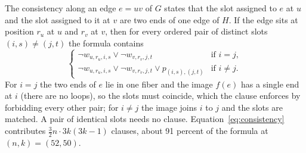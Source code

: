 The consistency along an edge $e = uv$ of $G$ states that the slot assigned to $e$ at $u$ and the slot assigned to it at $v$ are two ends of one edge of $H$. If the
edge sits at position $r_u$ at $u$ and $r_v$ at $v$, then for every ordered pair of distinct slots $(i,s) \ne (j,t)$ the formula contains
\begin{equation}\label{eq:consistency}
\begin{cases}
\neg w_{u,r_u,i,s} \vee \neg w_{v,r_v,j,t} & \text{if } i = j,\\
\neg w_{u,r_u,i,s} \vee \neg w_{v,r_v,j,t} \vee p_{(i,s),(j,t)} & \text{if } i \ne j.
\end{cases}
\end{equation}
For $i = j$ the two ends of $e$ lie in one fiber and the image $f(e)$ has a single end at $i$ (there are no loops), so the slots must coincide, which the clause
enforces by forbidding every other pair; for $i \ne j$ the image joins $i$ to $j$ and the slots are matched. A pair of identical slots needs no clause.
Equation~\eqref{eq:consistency} contributes $\tfrac32 n \cdot 3k(3k-1)$ clauses, about 91 percent of the formula at $(n,k) = (52,50)$.

